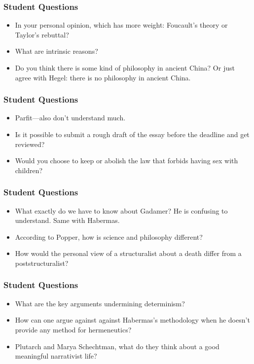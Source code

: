 \documentclass[xcolor=dvipsnames]{beamer}
\begin{document}
\begin{frame}
  \frametitle{Student Questions}
  \begin{itemize}
  \item In your personal opinion, which has more weight: Foucault's
    theory or Taylor's rebuttal?
  \item What are intrinsic reasons?
  \item Do you think there is some kind of philosophy in ancient
    China? Or just agree with Hegel: there is no philosophy in ancient
    China.
  \end{itemize}
\end{frame}

\begin{frame}
  \frametitle{Student Questions}
  \begin{itemize}
  \item Parfit---also don't understand much.
  \item Is it possible to submit a rough draft of the essay before the
    deadline and get reviewed?
  \item Would you choose to keep or abolish the law that forbids
    having sex with children?
  \end{itemize}
\end{frame}

\begin{frame}
  \frametitle{Student Questions}
  \begin{itemize}
  \item What exactly do we have to know about Gadamer? He is confusing
    to understand. Same with Habermas.
  \item According to Popper, how is science and philosophy different?
  \item How would the personal view of a structuralist about a death
    differ from a poststructuralist?
  \end{itemize}
\end{frame}

\begin{frame}
  \frametitle{Student Questions}
  \begin{itemize}
  \item What are the key arguments undermining determinism?
  \item How can one argue against against Habermas's methodology when
    he doesn't provide any method for hermeneutics?
  \item Plutarch and Marya Schechtman, what do they think about a good
    meaningful narrativist life?
  \end{itemize}
\end{frame}
\end{document}
